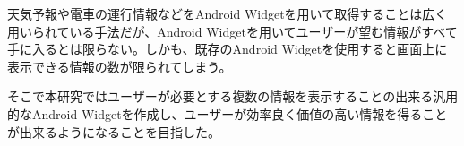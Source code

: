 
\begin{jabstract}
天気予報や電車の運行情報などをAndroid Widgetを用いて取得することは広く用いられている手法だが、Android Widgetを用いてユーザーが望む情報がすべて手に入るとは限らない。しかも、既存のAndroid Widgetを使用すると画面上に表示できる情報の数が限られてしまう。

そこで本研究ではユーザーが必要とする複数の情報を表示することの出来る汎用的なAndroid Widgetを作成し、ユーザーが効率良く価値の高い情報を得ることが出来るようになることを目指した。

\end{jabstract}
